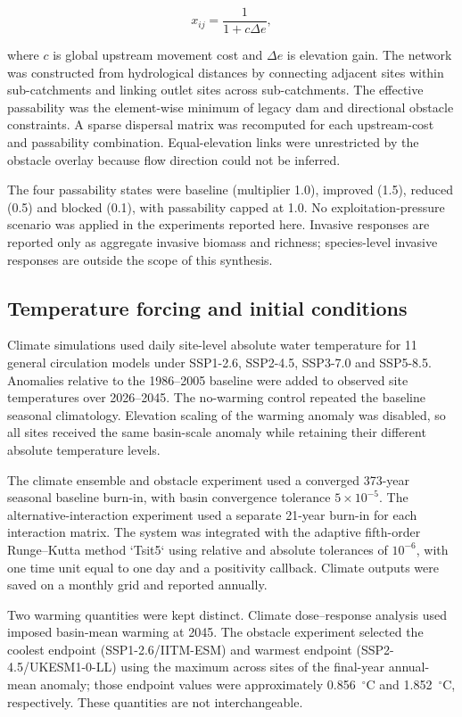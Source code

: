 \documentclass[11pt,a4paper]{article}
\begin{document}
\begin{equation}
x_{ij}=\frac{1}{1+c\Delta e},
\end{equation}

where $c$ is global upstream movement cost and $\Delta e$ is elevation gain. The network was constructed from hydrological distances by connecting adjacent sites within sub-catchments and linking outlet sites across sub-catchments. The effective passability was the element-wise minimum of legacy dam and directional obstacle constraints. A sparse dispersal matrix was recomputed for each upstream-cost and passability combination. Equal-elevation links were unrestricted by the obstacle overlay because flow direction could not be inferred.

The four passability states were baseline (multiplier 1.0), improved (1.5), reduced (0.5) and blocked (0.1), with passability capped at 1.0. No exploitation-pressure scenario was applied in the experiments reported here. Invasive responses are reported only as aggregate invasive biomass and richness; species-level invasive responses are outside the scope of this synthesis.

\subsection{Temperature forcing and initial conditions}

Climate simulations used daily site-level absolute water temperature for 11 general circulation models under SSP1-2.6, SSP2-4.5, SSP3-7.0 and SSP5-8.5. Anomalies relative to the 1986--2005 baseline were added to observed site temperatures over 2026--2045. The no-warming control repeated the baseline seasonal climatology. Elevation scaling of the warming anomaly was disabled, so all sites received the same basin-scale anomaly while retaining their different absolute temperature levels.

The climate ensemble and obstacle experiment used a converged 373-year seasonal baseline burn-in, with basin convergence tolerance $5\times10^{-5}$. The alternative-interaction experiment used a separate 21-year burn-in for each interaction matrix. The system was integrated with the adaptive fifth-order Runge--Kutta method `Tsit5` using relative and absolute tolerances of $10^{-6}$, with one time unit equal to one day and a positivity callback. Climate outputs were saved on a monthly grid and reported annually.

Two warming quantities were kept distinct. Climate dose--response analysis used imposed basin-mean warming at 2045. The obstacle experiment selected the coolest endpoint (SSP1-2.6/IITM-ESM) and warmest endpoint (SSP2-4.5/UKESM1-0-LL) using the maximum across sites of the final-year annual-mean anomaly; those endpoint values were approximately 0.856~$^\circ$C and 1.852~$^\circ$C, respectively. These quantities are not interchangeable.
\end{document}
